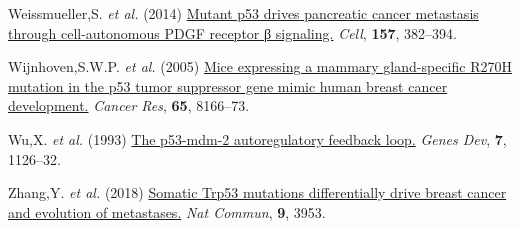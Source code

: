 \begin{CSLReferences}{1}{0}
\leavevmode{}%
Weissmueller,S. \emph{et al.} (2014) \href{https://doi.org/10.1016/j.cell.2014.01.066}{Mutant p53 drives pancreatic cancer metastasis through cell-autonomous PDGF receptor β signaling.} \emph{Cell}, \textbf{157}, 382--394.

\leavevmode{}%
Wijnhoven,S.W.P. \emph{et al.} (2005) \href{https://doi.org/10.1158/0008-5472.can-05-1650}{Mice expressing a mammary gland-specific R270H mutation in the p53 tumor suppressor gene mimic human breast cancer development.} \emph{Cancer Res}, \textbf{65}, 8166--73.

\leavevmode{}%
Wu,X. \emph{et al.} (1993) \href{https://doi.org/10.1101/gad.7.7a.1126}{The p53-mdm-2 autoregulatory feedback loop.} \emph{Genes Dev}, \textbf{7}, 1126--32.

\leavevmode{}%
Zhang,Y. \emph{et al.} (2018) \href{https://doi.org/10.1038/s41467-018-06146-9}{Somatic Trp53 mutations differentially drive breast cancer and evolution of metastases.} \emph{Nat Commun}, \textbf{9}, 3953.

\end{CSLReferences}
